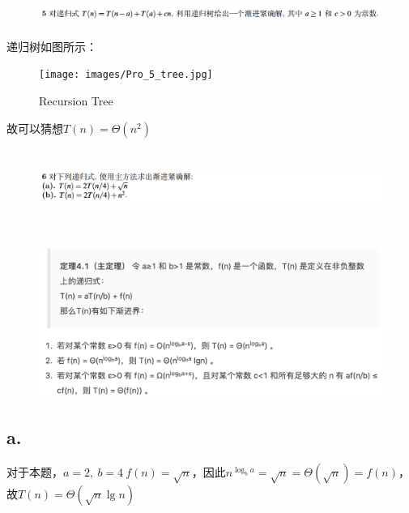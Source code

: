 \documentclass[]{report}
\begin{document}
    \section{}%
    \begin{figure}[h!]
      \centering
      \includegraphics[scale=0.3]{images/Pro_5.png}
    \end{figure}
    递归树如图所示：
    \begin{figure}[h!]
      \centering
      \texttt{[image: images/Pro\_5\_tree.jpg]}
      \caption{Recursion Tree}
    \end{figure}\par
    故可以猜想$T(n)=\Theta(n^2)$

    \section{}%
    \begin{figure}[h]
      \centering
      \begin{minipage}{40em}
        \centering
        \includegraphics[scale=0.3]{images/Pro_6.png}
      \end{minipage}\\
      \begin{minipage}{40em}
        \centering
        \includegraphics[scale=0.27]{images/Master_Theorem.png}
      \end{minipage}
    \end{figure}
    \subsection{a.}
      对于本题，$a=2,\ b=4\ f(n)=\sqrt{n}$，因此$n^{\log_ba}=\sqrt{n}=\Theta(\sqrt{n})=f(n)$，故$T(n)=\Theta(\sqrt{n}\lg n)$
\end{document}

